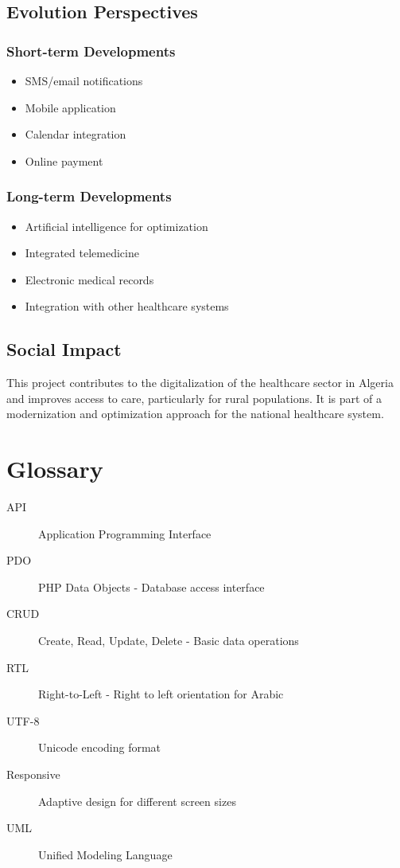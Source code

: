 \documentclass[12pt,a4paper]{report}
\begin{document}
\section{Evolution Perspectives}

\subsection{Short-term Developments}
\begin{itemize}
    \item SMS/email notifications
    \item Mobile application
    \item Calendar integration
    \item Online payment
\end{itemize}

\subsection{Long-term Developments}
\begin{itemize}
    \item Artificial intelligence for optimization
    \item Integrated telemedicine
    \item Electronic medical records
    \item Integration with other healthcare systems
\end{itemize}

\section{Social Impact}

This project contributes to the digitalization of the healthcare sector in Algeria and improves access to care, particularly for rural populations. It is part of a modernization and optimization approach for the national healthcare system.

\appendix

\chapter{Glossary}

\begin{description}
    \item[API] Application Programming Interface
    \item[PDO] PHP Data Objects - Database access interface
    \item[CRUD] Create, Read, Update, Delete - Basic data operations
    \item[RTL] Right-to-Left - Right to left orientation for Arabic
    \item[UTF-8] Unicode encoding format
    \item[Responsive] Adaptive design for different screen sizes
    \item[UML] Unified Modeling Language
\end{description}
\end{document}
